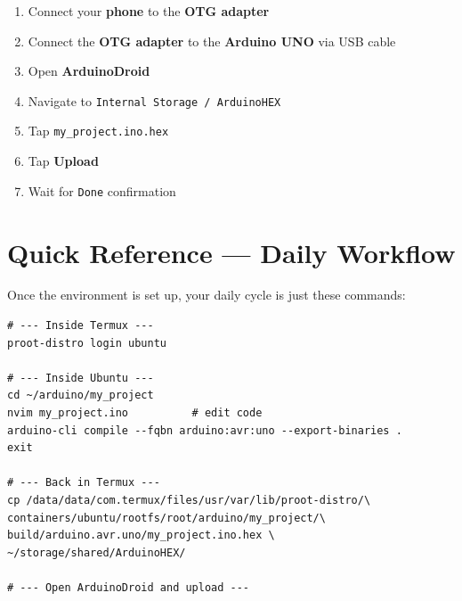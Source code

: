\documentclass[12pt,a4paper,openany]{report}
\begin{document}
\begin{enumerate}[label=\color{TermGreen}\ttfamily\bfseries\arabic*., leftmargin=*, itemsep=6pt]
  \item Connect your \textbf{phone} to the \textbf{OTG adapter}
  \item Connect the \textbf{OTG adapter} to the \textbf{Arduino UNO} via USB cable
  \item Open \textbf{ArduinoDroid}
  \item Navigate to \texttt{Internal Storage / ArduinoHEX}
  \item Tap \texttt{my\_project.ino.hex}
  \item Tap \textbf{Upload}
  \item Wait for \texttt{Done} confirmation
\end{enumerate}

\begin{center}
\end{center}

\section{Quick Reference --- Daily Workflow}

Once the environment is set up, your daily cycle is just these commands:

\begin{lstlisting}[style=shell, caption={Daily workflow --- Arduino C/C++}]
# --- Inside Termux ---
proot-distro login ubuntu

# --- Inside Ubuntu ---
cd ~/arduino/my_project
nvim my_project.ino          # edit code
arduino-cli compile --fqbn arduino:avr:uno --export-binaries .
exit

# --- Back in Termux ---
cp /data/data/com.termux/files/usr/var/lib/proot-distro/\
containers/ubuntu/rootfs/root/arduino/my_project/\
build/arduino.avr.uno/my_project.ino.hex \
~/storage/shared/ArduinoHEX/

# --- Open ArduinoDroid and upload ---
\end{lstlisting}
\end{document}
